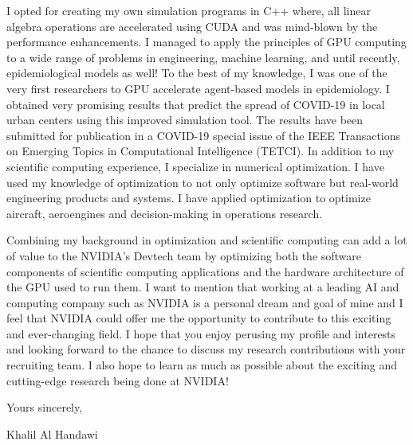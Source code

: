 \documentclass[12pt]{article} %
\begin{document}
\medskip %

I opted for creating my own simulation programs in C++ where, all linear algebra operations are accelerated using CUDA and was mind-blown by the performance enhancements. I managed to apply the principles of GPU computing to a wide range of problems in engineering, machine learning, and until recently, epidemiological models as well! To the best of my knowledge, I was one of the very first researchers to GPU accelerate agent-based models in epidemiology. I obtained very promising results that predict the spread of COVID-19 in local urban centers using this improved simulation tool. The results have been submitted for publication in a COVID-19 special issue of the IEEE Transactions on Emerging Topics in Computational Intelligence (TETCI). In addition to my scientific computing experience, I specialize in numerical optimization. I have used my knowledge of optimization to not only optimize software but real-world engineering products and systems. I have applied optimization to optimize aircraft, aeroengines and decision-making in operations research.

\medskip %

Combining my background in optimization and scientific computing can add a lot of value to the NVIDIA's Devtech team by optimizing both the software components of scientific computing applications and the hardware architecture of the GPU used to run them. I want to mention that working at a leading AI and computing company such as NVIDIA is a personal dream and goal of mine and I feel that NVIDIA could offer me the opportunity to contribute to this exciting and ever-changing field. I hope that you enjoy perusing my profile and interests and looking forward to the chance to discuss my research contributions with your recruiting team. I also hope to learn as much as possible about the exciting and cutting-edge research being done at NVIDIA!

\medskip %

Yours sincerely,

\medskip %

Khalil Al Handawi

\medskip %

\end{document}
